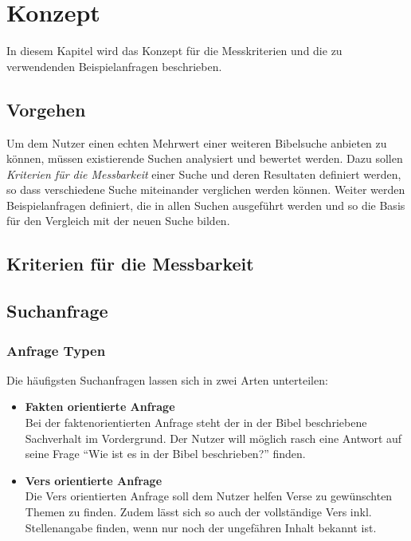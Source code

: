 \chapter{Konzept}
In diesem Kapitel wird das Konzept für die Messkriterien und die zu verwendenden Beispielanfragen beschrieben.

\section{Vorgehen}
Um dem Nutzer einen echten Mehrwert einer weiteren Bibelsuche anbieten zu können, müssen existierende Suchen analysiert und bewertet werden.
Dazu sollen \textit{Kriterien für die Messbarkeit} einer Suche und deren Resultaten definiert werden, so dass verschiedene Suche miteinander verglichen werden können.
Weiter werden Beispielanfragen definiert, die in allen Suchen ausgeführt werden und so die Basis für den Vergleich mit der neuen Suche bilden.

\section{Kriterien für die Messbarkeit}


\section{Suchanfrage }

\subsection{Anfrage Typen}
Die häufigsten Suchanfragen lassen sich in zwei Arten unterteilen:
\begin{itemize}
	\item \textbf{Fakten orientierte Anfrage}\\
		Bei der faktenorientierten Anfrage steht der in der Bibel beschriebene Sachverhalt im Vordergrund. Der Nutzer will möglich rasch eine Antwort auf seine Frage "`Wie ist es in der Bibel beschrieben?"' finden.

	\item \textbf{Vers orientierte Anfrage}\\
		Die Vers orientierten Anfrage soll dem Nutzer helfen Verse zu gewünschten Themen zu finden.
		Zudem lässt sich so auch der vollständige Vers inkl. Stellenangabe finden, wenn nur noch der ungefähren Inhalt bekannt ist.
\end{itemize}


